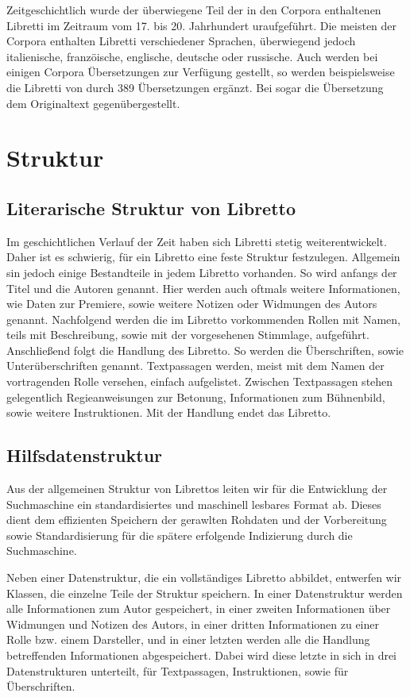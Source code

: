 Zeitgeschichtlich wurde der überwiegene Teil der
in den Corpora enthaltenen Libretti
im Zeitraum vom 17. bis 20. Jahrhundert uraufgeführt.
Die meisten der Corpora enthalten Libretti verschiedener Sprachen,
überwiegend jedoch italienische, franzöische,
englische, deutsche oder russische.
Auch werden bei einigen Corpora Übersetzungen zur Verfügung gestellt,
so werden beispielsweise die Libretti von 
durch 389 Übersetzungen ergänzt.
Bei  sogar die Übersetzung
dem Originaltext gegenübergestellt.

\section{Struktur}

\subsection{Literarische Struktur von Libretto}
Im geschichtlichen Verlauf der Zeit haben sich Libretti
stetig weiterentwickelt.
Daher ist es schwierig, für ein Libretto eine feste Struktur festzulegen.
Allgemein sin jedoch einige Bestandteile in jedem Libretto vorhanden.
So wird anfangs der Titel und die Autoren genannt.
Hier werden auch oftmals weitere Informationen, wie Daten zur Premiere,
sowie weitere Notizen oder Widmungen des Autors genannt.
Nachfolgend werden die im Libretto vorkommenden Rollen mit Namen,
teils mit Beschreibung, sowie mit der vorgesehenen Stimmlage, aufgeführt.
Anschließend folgt die Handlung des Libretto.
So werden die Überschriften, sowie Unterüberschriften genannt.
Textpassagen werden, meist mit dem Namen der vortragenden Rolle versehen,
einfach aufgelistet. Zwischen Textpassagen stehen gelegentlich
Regieanweisungen zur Betonung, Informationen zum Bühnenbild,
sowie weitere Instruktionen.
Mit der Handlung endet das Libretto.

\subsection{Hilfsdatenstruktur}
Aus der allgemeinen Struktur von Librettos
leiten wir für die Entwicklung der Suchmaschine
ein standardisiertes und maschinell lesbares Format ab.
Dieses dient dem effizienten Speichern der gerawlten Rohdaten
und der Vorbereitung sowie Standardisierung
für die spätere erfolgende Indizierung durch die Suchmaschine.

Neben einer Datenstruktur, die ein vollständiges Libretto abbildet,
entwerfen wir Klassen, die einzelne Teile der Struktur speichern.
In einer Datenstruktur werden alle Informationen zum Autor gespeichert,
in einer zweiten Informationen über Widmungen und Notizen des Autors,
in einer dritten Informationen zu einer Rolle bzw. einem Darsteller,
und in einer letzten werden alle
die Handlung betreffenden Informationen abgespeichert.
Dabei wird diese letzte in sich in drei Datenstrukturen unterteilt,
für Textpassagen, Instruktionen, sowie für Überschriften.

